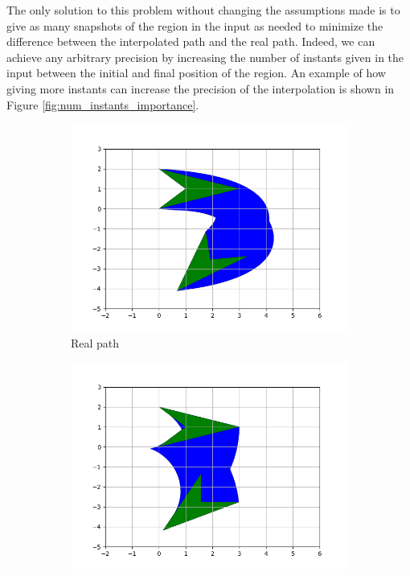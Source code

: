 The only solution to this problem without changing the assumptions made is to give as many snapshots of the region in the input as needed to minimize the difference between the interpolated path and the real path. Indeed, we can achieve any arbitrary precision by increasing the number of instants given in the input between the initial and final position of the region. An example of how giving more instants can increase the precision of the interpolation is shown in Figure \ref{fig:num_instants_importance}. \\

\begin{figure}[h!]
\centering
\begin{subfigure}{.475\textwidth}
  \centering
  \includegraphics[width=\textwidth]{images/path_real.png}
  \caption{Real path}
  \label{fig:real_path}
\end{subfigure}
\hfill
\begin{subfigure}{.475\textwidth}
  \centering
  \includegraphics[width=\textwidth]{images/path_no_instants.png}

\end{subfigure}
\end{figure}
